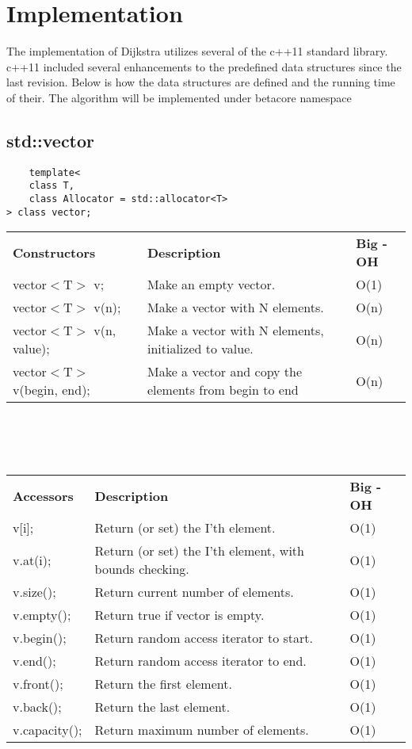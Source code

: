 \documentclass[12pt]{article}
\begin{document}
\section[Implementation]{Implementation}
The implementation of Dijkstra utilizes several of the c++11 standard library. c++11
included several enhancements to the predefined data structures since the last revision. Below is how the
 data structures are defined and the running time of their. The algorithm will be implemented under betacore namespace
\subsection{std::vector}
\begin{lstlisting}
	template<
    class T,
    class Allocator = std::allocator<T>
> class vector;
\end{lstlisting}
\begin{tabular}{ l l l }
\textbf{Constructors} & \textbf{Description} & \textbf{Big - OH}\\
vector$<$T$>$ v; & Make an empty vector. & O(1)\\
vector$<$T$>$ v(n); & Make a vector with N elements. & O(n)\\
vector$<$T$>$ v(n, value); & Make a vector with N elements, initialized to value. & O(n)\\
vector$<$T$>$ v(begin, end); & Make a vector and copy the elements from begin to end & O(n)\\
\end{tabular}
\\
\\
\\
\begin{tabular}{ l l l }
\textbf{Accessors} & \textbf{Description} & \textbf{Big - OH}\\
v[i]; & Return (or set) the I'th element. & O(1)\\
v.at(i); & Return (or set) the I'th element, with bounds checking. & O(1)\\
v.size(); & Return current number of elements. & O(1)\\
v.empty(); & Return true if vector is empty. & O(1)\\
v.begin(); & Return random access iterator to start. & O(1)\\
v.end(); & Return random access iterator to end. & O(1)\\
v.front(); & Return the first element. & O(1)\\
v.back(); & Return the last element. & O(1)\\
v.capacity(); & Return maximum number of elements. & O(1)\\
\end{tabular}
\end{document}
